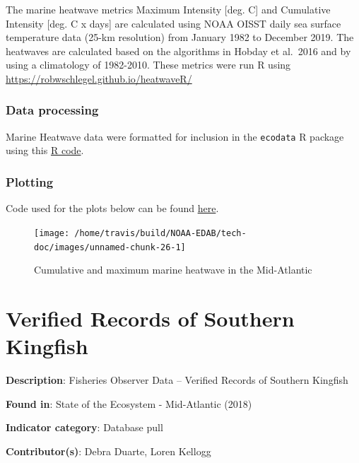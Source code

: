 \documentclass[
]{book}
\begin{document}
The marine heatwave metrics Maximum Intensity {[}deg. C{]} and Cumulative Intensity {[}deg. C x days{]} are calculated using NOAA OISST daily sea surface temperature data (25-km resolution) from January 1982 to December 2019. The heatwaves are calculated based on the algorithms in Hobday et al.~2016 and by using a climatology of 1982-2010. These metrics were run R using \url{https://robwschlegel.github.io/heatwaveR/}

\hypertarget{data-processing-17}{%
\subsection{Data processing}\label{data-processing-17}}

Marine Heatwave data were formatted for inclusion in the \texttt{ecodata} R package using this \href{https://github.com/NOAA-EDAB/ecodata/blob/master/data-raw/get_marine_heatwave.R}{R code}.

\hypertarget{plotting-17}{%
\subsection{Plotting}\label{plotting-17}}

Code used for the plots below can be found \href{https://github.com/NOAA-EDAB/ecodata/blob/master/chunk-scripts/LTL.Rmd-heatwave_mab.R}{here}.

\begin{figure}

{\centering \texttt{[image: /home/travis/build/NOAA-EDAB/tech-doc/images/unnamed-chunk-26-1]} 

}

\caption{Cumulative and maximum marine heatwave in the Mid-Atlantic}\label{fig:unnamed-chunk-26}
\end{figure}

\hypertarget{verified-records-of-southern-kingfish}{%
\chapter{Verified Records of Southern Kingfish}\label{verified-records-of-southern-kingfish}}

\textbf{Description}: Fisheries Observer Data -- Verified Records of Southern Kingfish

\textbf{Found in}: State of the Ecosystem - Mid-Atlantic (2018)

\textbf{Indicator category}: Database pull

\textbf{Contributor(s)}: Debra Duarte, Loren Kellogg
\end{document}
